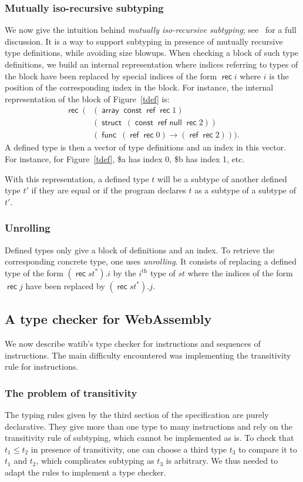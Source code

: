 \documentclass[a4paper,11pt]{article}
\DeclareMathOperator{\reft}{\textsf{ref}}
\DeclareMathOperator{\rect}{\textsf{rec}}
\DeclareMathOperator{\strt}{\textsf{struct}}
\DeclareMathOperator{\arrt}{\textsf{array}}
\DeclareMathOperator{\funt}{\textsf{func}}
\DeclareMathOperator{\cstt}{\textsf{const}}
\DeclareMathOperator{\refnullt}{\textsf{ref null}}
\begin{document}
\subsubsection{Mutually iso-recursive subtyping}\label{deft}
We now give the intuition behind \emph{mutually iso-recursive subtyping};
see~\cite{rossberg2023mutually} for a full discussion. It is a way to support
subtyping in presence of mutually recursive type definitions, while avoiding
size blowups. When checking a block of such type definitions, we build an
internal representation where indices referring to types of the block have been
replaced by special indices of the form $\rect i$ where $i$ is the position of
the corresponding index in the block. For instance, the internal representation of the block
of Figure~\ref{tdef} is:
\begin{align*}
\rect\ (& (\arrt \cstt\reft \rect 1)\\
&(\strt\ (\cstt \refnullt \rect 2))\\
&(\funt\ (\reft \rect 0)\to (\reft \rect 2))).
\end{align*}
A defined type is then a vector of type definitions and an index in this vector.
For instance, for Figure~\ref{tdef}, \textsf{\$a} has index 0, \textsf{\$b} has
index 1, etc.

With this representation, a defined type $t$ will be a subtype of another
defined type $t'$ if they are equal or if the program declares $t$ as a subtype
of a subtype of $t'$.

\subsubsection{Unrolling}
Defined types only give a block of definitions and an index. To retrieve the
corresponding concrete type, one uses \emph{unrolling}. It consists of replacing
a defined type of the form $(\rect st^*).i$ by the $i^{\text{th}}$ type of $st$
where the indices of the form $\rect j$ have been replaced by $(\rect st^*).j$.

\subsection{A type checker for WebAssembly}\label{algo}
We now describe \textsf{watib}'s type checker for instructions and sequences of
instructions. The main difficulty encountered was implementing the transitivity
rule for instructions.
\subsubsection{The problem of transitivity}
The typing rules given by the third section of the specification are purely
declarative. They give more than one type to many instructions and rely on the
transitivity rule of subtyping, which cannot be implemented as is. To check that
$t_1 \leq t_2$ in presence of transitivity, one can choose a third type $t_3$ to
compare it to $t_1$ and $t_2$, which complicates subtyping as $t_3$ is
arbitrary. We thus needed to adapt the rules to implement a type checker.
\end{document}
